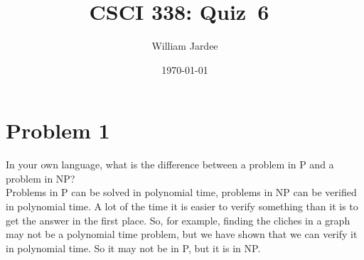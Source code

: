 \documentclass[11pt]{article}
\begin{document}
\graphicspath{{../images/}}

\title{CSCI 338: Quiz~6~}
\author{William Jardee}
\date{\today}
\maketitle


\section*{Problem 1}
    In your own language, what is the difference between a problem in P and a problem in NP?\\
    
    Problems in P can be solved in polynomial time, problems in NP can be verified in polynomial time. A lot of the time it is easier to verify something than it is to get the answer in the first place. So, for example, finding the cliches in a graph may not be a polynomial time problem, but we have shown that we can verify it in polynomial time. So it may not be in P, but it is in NP. 
\end{document}
